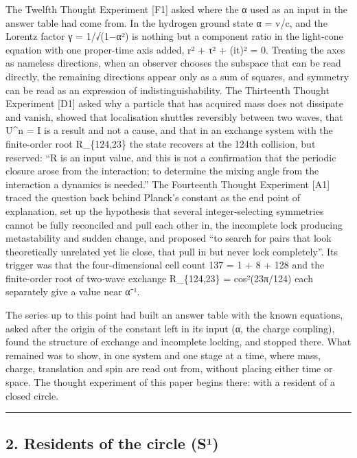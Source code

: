 \documentclass[
  a4paper,
]{article}
\begin{document}
The Twelfth Thought Experiment {[}F1{]} asked where the α used as an
input in the answer table had come from. In the hydrogen ground state α
= v/c, and the Lorentz factor γ = 1/√(1−α²) is nothing but a component
ratio in the light-cone equation with one proper-time axis added, r² +
τ² + (it)² = 0. Treating the axes as nameless directions, when an
observer chooses the subspace that can be read directly, the remaining
directions appear only as a sum of squares, and symmetry can be read as
an expression of indistinguishability. The Thirteenth Thought Experiment
{[}D1{]} asked why a particle that has acquired mass does not dissipate
and vanish, showed that localisation shuttles reversibly between two
waves, that U\^{}n = I is a result and not a cause, and that in an
exchange system with the finite-order root R\_\{124,23\} the state
recovers at the 124th collision, but reserved: ``R is an input value,
and this is not a confirmation that the periodic closure arose from the
interaction; to determine the mixing angle from the interaction a
dynamics is needed.'' The Fourteenth Thought Experiment {[}A1{]} traced
the question back behind Planck's constant as the end point of
explanation, set up the hypothesis that several integer-selecting
symmetries cannot be fully reconciled and pull each other in, the
incomplete lock producing metastability and sudden change, and proposed
``to search for pairs that look theoretically unrelated yet lie close,
that pull in but never lock completely''. Its trigger was that the
four-dimensional cell count 137 = 1 + 8 + 128 and the finite-order root
of two-wave exchange R\_\{124,23\} = cos²(23π/124) each separately give
a value near α⁻¹.

The series up to this point had built an answer table with the known
equations, asked after the origin of the constant left in its input (α,
the charge coupling), found the structure of exchange and incomplete
locking, and stopped there. What remained was to show, in one system and
one stage at a time, where mass, charge, translation and spin are read
out from, without placing either time or space. The thought experiment
of this paper begins there: with a resident of a closed circle.

\begin{center}\rule{0.5\linewidth}{0.5pt}\end{center}

\subsection{2. Residents of the circle
(S¹)}\label{residents-of-the-circle-suxb9}
\end{document}
